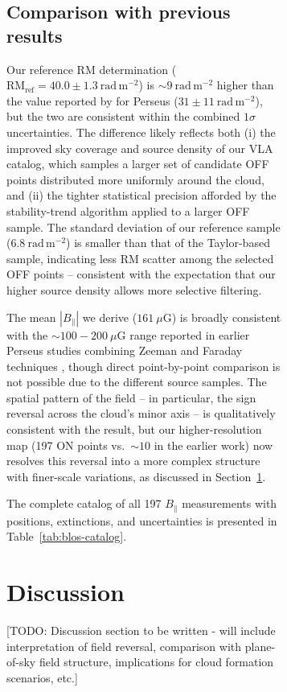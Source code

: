 \documentclass[twocolumn]{aastex631}
\begin{document}
\begin{figure}
\begin{figure}
\subsection{Comparison with previous results}

Our reference RM determination ($\mathrm{RM_{ref}} = 40.0 \pm 1.3~\mathrm{rad\,m^{-2}}$) is $\sim9~\mathrm{rad\,m^{-2}}$ higher than the value reported by \citet{tahani2018} for Perseus ($31 \pm 11~\mathrm{rad\,m^{-2}}$), but the two are consistent within the combined $1\sigma$ uncertainties. The difference likely reflects both (i) the improved sky coverage and source density of our VLA catalog, which samples a larger set of candidate OFF points distributed more uniformly around the cloud, and (ii) the tighter statistical precision afforded by the stability-trend algorithm applied to a larger OFF sample. The standard deviation of our reference sample ($6.8~\mathrm{rad\,m^{-2}}$) is smaller than that of the Taylor-based sample, indicating less RM scatter among the selected OFF points -- consistent with the expectation that our higher source density allows more selective filtering.

The mean $|B_\parallel|$ we derive ($161~\mu$G) is broadly consistent with the $\sim100-200~\mu$G range reported in earlier Perseus studies combining Zeeman and Faraday techniques \citep{tahani2018, tahani2022b}, though direct point-by-point comparison is not possible due to the different source samples. The spatial pattern of the field -- in particular, the sign reversal across the cloud's minor axis -- is qualitatively consistent with the \citet{tahani2018} result, but our higher-resolution map (197 ON points vs.\ $\sim10$ in the earlier work) now resolves this reversal into a more complex structure with finer-scale variations, as discussed in Section~\ref{sec:discussion}.

The complete catalog of all 197 $B_\parallel$ measurements with positions, extinctions, and uncertainties is presented in Table~\ref{tab:blos-catalog}.



\section{Discussion}
\label{sec:discussion}

[TODO: Discussion section to be written - will include interpretation of field reversal, comparison with plane-of-sky field structure, implications for cloud formation scenarios, etc.]


\end{figure}
\end{figure}
\end{document}
